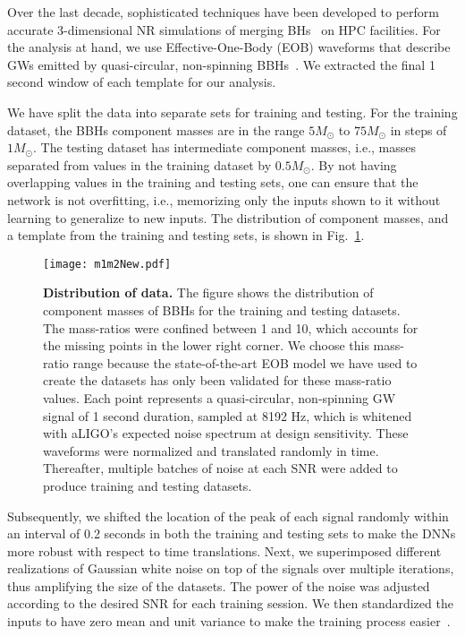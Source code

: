 \documentclass[aps,prd,%
amsmath,floats,floatfix, twocolumn, superscriptaddress,nofootinbib,showpacs]{revtex4-1}
\def\Msun{M_\odot}
\begin{document}
Over the last decade, sophisticated techniques have been developed to perform accurate 3-dimensional NR simulations of merging BHs~\cite{Mroue:2013,ETL:2012CQGra} on HPC facilities. For the analysis at hand, we use Effective-One-Body (EOB) waveforms that describe GWs emitted by quasi-circular, non-spinning BBHs~\cite{Tara:2014}. We extracted the final 1 second window of each template for our analysis.

We have split the data into separate sets for training and testing. For the training dataset, the BBHs component masses are in the range $5\Msun$ to $75\Msun$ in steps of $1\Msun$. The testing dataset has intermediate component masses, i.e., masses separated from values in the training dataset by $0.5\Msun$. By not having overlapping values in the training and testing sets, one can ensure that the network is not overfitting, i.e., memorizing only the inputs shown to it without learning to generalize to new inputs. The distribution of component masses, and a template from the training and testing sets, is shown in Fig.~\ref{fig:m1m2}.

\begin{figure}
	\hspace{-.2in}	\texttt{[image: m1m2New.pdf]}\hspace{6em}
	\caption{\textbf{Distribution of data.} The figure shows the distribution of component masses of BBHs for the training and testing datasets. The mass-ratios were confined between 1 and 10, which accounts for the missing points in the lower right corner. We choose this mass-ratio range because the state-of-the-art EOB model we have used to create the datasets has only been validated for these mass-ratio values. Each point represents a quasi-circular, non-spinning GW signal of 1 second duration, sampled at 8192 Hz, which is whitened with aLIGO's expected noise spectrum at design sensitivity. These waveforms were normalized and translated randomly in time. Thereafter, multiple batches of noise at each SNR were added to produce training and testing datasets.}
	\label{fig:m1m2}
\end{figure}

\noindent Subsequently, we shifted the location of the peak of each signal randomly within an interval of 0.2 seconds in both the training and testing sets to make the DNNs more robust with respect to time translations. Next, we superimposed different realizations of Gaussian white noise on top of the signals over multiple iterations, thus amplifying the size of the datasets. The power of the noise was adjusted according to the desired SNR for each training session. We then standardized the inputs to have zero mean and unit variance to make the training process easier~\cite{LeCun98}.
\end{document}
